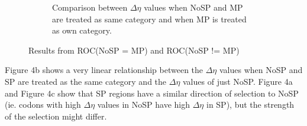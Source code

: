 \documentclass[11pt]{labbook}
\begin{document}
\begin{figure}
\begin{subfigure}{0.52\textwidth}
\caption{Comparison between $\Delta\eta$ values when NoSP and MP are treated as same category and when MP is treated as own category.}
\end{subfigure}
\caption{Results from ROC(NoSP = MP) and ROC(NoSP != MP)}
\end{figure}

Figure 4b shows a very linear relationship between the $\Delta\eta$ values when NoSP and SP are treated as the same category and the $\Delta\eta$ values of just NoSP. Figure 4a and Figure 4c show that SP regions have a similar direction of selection to NoSP (ie. codons with high $\Delta\eta$ values in NoSP have high $\Delta\eta$ in SP), but the strength of the selection might differ.
\end{document}
